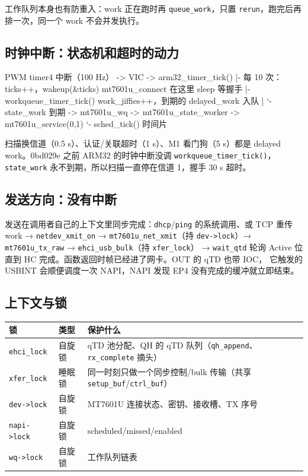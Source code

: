 \documentclass[UTF8,zihao=-4,fontset=none]{ctexart}
\newcommand{\fn}[1]{\texttt{#1}}
\begin{document}
工作队列本身也有防重入：work 正在跑时再 \fn{queue\_work}，只置 \fn{rerun}，跑完后再排一次，同一个 work 不会并发执行。

\subsection{时钟中断：状态机和超时的动力}

\begin{code}
PWM timer4 中断（100 Hz） -> VIC -> arm32_timer_tick()
   |- 每 10 次：ticks++，wakeup(&ticks)        mt7601u_connect 在这里 sleep 等握手
   |- workqueue_timer_tick()                    work_jiffies++，到期的 delayed_work 入队
   |      `- state_work 到期 -> mt7601u_wq -> mt7601u_state_worker -> mt7601u_service(0,1)
   `- sched_tick()                              时间片
\end{code}
扫描换信道（0.5 s）、认证/关联超时（1 s）、M1 看门狗（5 s）都是 delayed work。0bd029e 之前 ARM32 的时钟中断没调
\fn{workqueue\_timer\_tick()}，\fn{state\_work} 永不到期，所以扫描一直停在信道 1，握手 30 s 超时。

\subsection{发送方向：没有中断}

发送在调用者自己的上下文里同步完成：\fn{dhcp}/\fn{ping} 的系统调用、或 TCP 重传 work →
\fn{netdev\_xmit\_on} → \fn{mt7601u\_net\_xmit}（持 \fn{dev->lock}）→ \fn{mt7601u\_tx\_raw} → \fn{ehci\_usb\_bulk}（持 \fn{xfer\_lock}）
→ \fn{wait\_qtd} 轮询 Active 位直到 HC 完成。函数返回时帧已经进了网卡。OUT 的 qTD 也带 IOC，
它触发的 USBINT 会顺便调度一次 NAPI，NAPI 发现 EP4 没有完成的缓冲就立即结束。

\subsection{上下文与锁}

\begin{longtable}{p{30mm}p{40mm}p{78mm}}
\toprule
锁 & 类型 & 保护什么 \\ \midrule \endhead
\fn{ehci\_lock} & 自旋锁 & qTD 池分配、QH 的 qTD 队列（\fn{qh\_append}、\fn{rx\_complete} 摘头） \\
\fn{xfer\_lock} & 睡眠锁 & 同一时刻只做一个同步控制/bulk 传输（共享 \fn{setup\_buf}/\fn{ctrl\_buf}） \\
\fn{dev->lock} & 自旋锁 & MT7601U 连接状态、密钥、接收槽、TX 序号 \\
\fn{napi->lock} & 自旋锁 & scheduled/missed/enabled \\
\fn{wq->lock} & 自旋锁 & 工作队列链表 \\
\bottomrule
\end{longtable}
\end{document}
